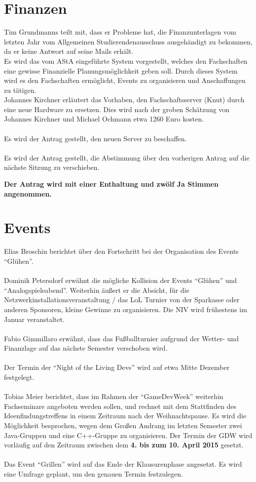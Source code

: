 \documentclass[a4paper, 11pt]{article} %
\begin{document}
\section{Finanzen}
Tim Grundmanns teilt mit, dass er Probleme hat, die Finanzunterlagen vom letzten Jahr vom Allgemeinen Studierendenausschuss ausgehändigt zu bekommen, da er keine Antwort auf seine Mails erhält.
\\
Es wird das vom AStA eingeführte System vorgestellt, welches den Fachschaften eine gewisse Finanzielle Planungsmöglichkeit geben soll. Durch dieses System wird es den Fachschaften ermöglicht, Events zu organisieren und Anschaffungen zu tätigen.
\\
Johannes Kirchner erläutert das Vorhaben, den Fachschaftsserver (Knut) durch eine neue Hardware zu ersetzen. Dies wird nach der groben Schätzung von Johannes Kirchner und Michael Ochmann etwa 1260 Euro kosten.
\\\\
Es wird der Antrag gestellt, den neuen Server zu beschaffen.
\\\\
Es wird der Antrag gestellt, die Abstimmung über den vorherigen Antrag auf die nächste Sitzung zu verschieben.
\begin{center}
	\textbf{Der Antrag wird mit einer Enthaltung und zwölf Ja Stimmen angenommen.}
\end{center}

\section{Events}
Elias Broschin berichtet über den Fortschritt  bei der Organisation des Events "`Glühen"'.
\\\\
Dominik Petersdorf erwähnt die mögliche Kollision der Events "`Glühen"' und "`Analogspieleabend"'.
Weiterhin äußert er die Absicht, für die Netzwerkinstallationsveranstaltung / das LoL Turnier von der Sparkasse oder anderen Sponsoren, kleine Gewinne zu organisieren.
Die NIV wird frühestens im Januar veranstaltet.
\\\\
Fabio Gimmillaro erwähnt, dass das Fußballturnier aufgrund der Wetter- und Finanzlage auf das nächste Semester verschoben wird.
\\\\
Der Termin der "`Night of the Living Devs"' wird auf etwa Mitte Dezember festgelegt.
\\\\
Tobias Meier berichtet, dass im Rahmen der "`GameDevWeek"' weiterhin Fachseminare angeboten werden sollen, und rechnet mit dem Stattfinden des Ideenfindungstreffens in einem Zeitraum nach der Weihnachtspause.
Es wird die Möglichkeit besprochen, wegen dem Großen Andrang im letzten Semester zwei Java-Gruppen und eine C++-Gruppe zu organisieren. 
Der Termin der GDW wird vorläufig auf den Zeitraum zwischen dem \textbf{4. bis zum 10. April 2015} gesetzt.
\\\\
Das Event "`Grillen"' wird auf das Ende der Klausurenphase angesetzt. Es wird eine Umfrage geplant, um den genauen Termin festzulegen.
\end{document}
